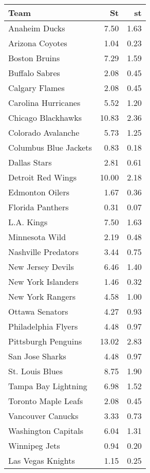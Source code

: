\begin{table}[ht]
\centering
\begin{tabular}{lrr}
\hline
Team & St & st \\ 
\hline
Anaheim Ducks & 7.50 & 1.63 \\ 
Arizona Coyotes & 1.04 & 0.23 \\ 
Boston Bruins & 7.29 & 1.59 \\ 
Buffalo Sabres & 2.08 & 0.45 \\ 
Calgary Flames & 2.08 & 0.45 \\ 
Carolina Hurricanes & 5.52 & 1.20 \\ 
Chicago Blackhawks & 10.83 & 2.36 \\ 
Colorado Avalanche & 5.73 & 1.25 \\ 
Columbus Blue Jackets & 0.83 & 0.18 \\ 
Dallas Stars & 2.81 & 0.61 \\ 
Detroit Red Wings & 10.00 & 2.18 \\ 
Edmonton Oilers & 1.67 & 0.36 \\ 
Florida Panthers & 0.31 & 0.07 \\ 
L.A. Kings & 7.50 & 1.63 \\ 
Minnesota Wild & 2.19 & 0.48 \\ 
Nashville Predators & 3.44 & 0.75 \\ 
New Jersey Devils & 6.46 & 1.40 \\ 
New York Islanders & 1.46 & 0.32 \\ 
New York Rangers & 4.58 & 1.00 \\ 
Ottawa Senators & 4.27 & 0.93 \\ 
Philadelphia Flyers & 4.48 & 0.97 \\ 
Pittsburgh Penguins & 13.02 & 2.83 \\ 
San Jose Sharks & 4.48 & 0.97 \\ 
St. Louis Blues & 8.75 & 1.90 \\ 
Tampa Bay Lightning & 6.98 & 1.52 \\ 
Toronto Maple Leafs & 2.08 & 0.45 \\ 
Vancouver Canucks & 3.33 & 0.73 \\ 
Washington Capitals & 6.04 & 1.31 \\ 
Winnipeg Jets & 0.94 & 0.20 \\ 
Las Vegas Knights & 1.15 & 0.25 \\ 
\hline
\end{tabular}
\end{table}
